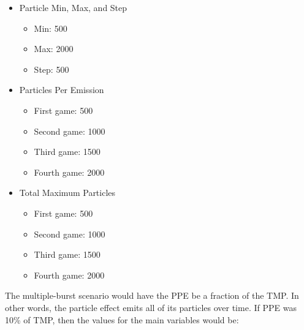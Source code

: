 \begin{itemize}[nolistsep,topsep=0pt]

	\item Particle Min, Max, and Step 
		\begin{itemize}[nolistsep,topsep=0pt]
			\item Min: 500
			\item Max: 2000
			\item Step: 500
		\end{itemize}

	\item Particles Per Emission
		\begin{itemize}[nolistsep,topsep=0pt]
			\item First game: 500
			\item Second game: 1000
			\item Third game: 1500
			\item Fourth game: 2000
		\end{itemize}

	\item Total Maximum Particles
		\begin{itemize}[nolistsep,topsep=0pt]
			\item First game: 500
			\item Second game: 1000
			\item Third game: 1500
			\item Fourth game: 2000
		\end{itemize}

\end{itemize}

The multiple-burst scenario would have the PPE be a fraction of the TMP. In other words, the particle effect emits all of its particles over time. If PPE was 10\% of TMP, then the values for the main variables would be:

